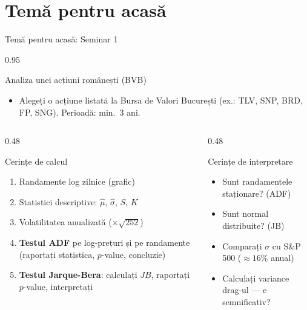\documentclass[9pt, aspectratio=169, t]{beamer}
\begin{document}
\section{Temă pentru acasă}

\begin{frame}[shrink=5]{Temă pentru acasă: Seminar 1}
    \begin{cminipage}{0.95\textwidth}
    \begin{block}{Analiza unei acțiuni românești (BVB)}
    \begin{itemize}\setlength{\itemsep}{0pt}
        \item Alegeți o acțiune listată la Bursa de Valori București (ex.: TLV, SNP, BRD, FP, SNG). Perioadă: min.\ 3 ani.
    \end{itemize}
    \end{block}
    \vspace{0.1cm}
    \begin{columns}[T]
    \begin{column}{0.48\textwidth}
    \begin{exampleblock}{Cerințe de calcul}
    \begin{enumerate}\setlength{\itemsep}{0pt}
        \item Randamente log zilnice (grafic)
        \item Statistici descriptive: $\hat\mu$, $\hat\sigma$, $S$, $K$
        \item Volatilitatea anualizată ($\times \sqrt{252}$)
        \item \textbf{Testul ADF} pe log-prețuri și pe randamente (raportați statistica, $p$-value, concluzie)
        \item \textbf{Testul Jarque-Bera}: calculați $JB$, raportați $p$-value, interpretați
    \end{enumerate}
    \end{exampleblock}
    \end{column}
    \begin{column}{0.48\textwidth}
    \begin{block}{Cerințe de interpretare}
    \begin{itemize}\setlength{\itemsep}{0pt}
        \item Sunt randamentele staționare? (ADF)
        \item Sunt normal distribuite? (JB)
        \item Comparați $\sigma$ cu S\&P 500 ($\approx 16\%$ anual)
        \item Calculați variance drag-ul --- e semnificativ?

\end{itemize}
\end{block}
\end{column}
\end{columns}
\end{cminipage}
\end{frame}
\end{document}
